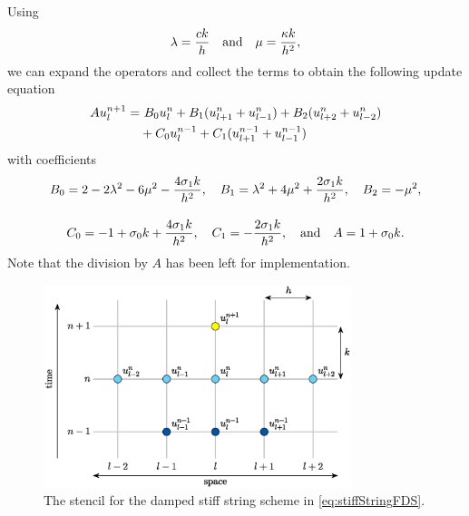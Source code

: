 Using 
\begin{equation}
    \lambda = \frac{ck}{h} \quad \text{and} \quad \mu = \frac{\kappa k}{h^2},
\end{equation}
we can expand the operators and collect the terms to obtain the following update equation
\begin{equation}
    \begin{aligned}
    Au_l^{n+1} = &\ B_0 u_l^n + B_1 (u_{l+1}^n + u_{l-1}^n) + B_2 (u_{l+2}^n + u_{l-2}^n) \\
    &+ C_0 u_l^{n-1} + C_1(u_{l+1}^{n-1} + u_{l-1}^{n-1}) 
    \end{aligned}
\end{equation}
with coefficients
\begin{gather*}
    B_0 = 2 - 2\lambda^2 - 6\mu^2 - \frac{4\sigma_{1} k}{h^2}, \quad B_1 = \lambda^2 + 4\mu^2 + \frac{2\sigma_{1} k}{h^2}, \quad B_2 =- \mu^2, \\[1em]
    C_0 =  -1+\sigma_{0} k + \frac{4\sigma_{1} k}{h^2},\quad C_1 = - \frac{2\sigma_{1} k}{h^2}, \quad \text{and} \quad A = 1+\sigma_{0} k.
\end{gather*}
Note that the division by $A$ has been left for implementation. 
\begin{figure}[h]
    \centering
    \includegraphics[width=0.8\textwidth]{figures/resonators/stencilDampedStiffString.eps}
    \caption{The stencil for the damped stiff string scheme in \eqref{eq:stiffStringFDS}.\label{fig:stencilStiffString}}
\end{figure}

